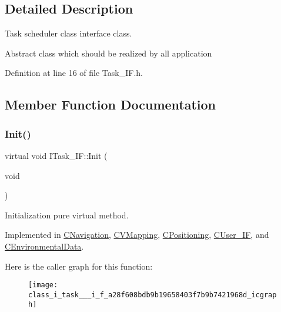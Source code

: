 \subsection{Detailed Description}
Task scheduler class interface class. 

Abstract class which should be realized by all application 

Definition at line 16 of file Task\+\_\+\+I\+F.\+h.



\subsection{Member Function Documentation}
\mbox{\label{class_i_task___i_f_a28f608bdb9b19658403f7b9b7421968d}} 
\subsubsection{\texorpdfstring{Init()}{Init()}}
{\footnotesize\ttfamily virtual void I\+Task\+\_\+\+I\+F\+::\+Init (\begin{DoxyParamCaption}\item[{void}]{ }\end{DoxyParamCaption})\hspace{0.3cm}{\ttfamily [pure virtual]}}



Initialization pure virtual method. 



Implemented in \mbox{\hyperlink{class_c_navigation_a86a0756663ccf76e9c474764b8f7a04f}{C\+Navigation}}, \mbox{\hyperlink{class_c_v_mapping_a110257122b8946bcb8f17051070e03eb}{C\+V\+Mapping}}, \mbox{\hyperlink{class_c_positioning_abdceba66e701554a178acf61c61b0df6}{C\+Positioning}}, \mbox{\hyperlink{class_c_user___i_f_a02c8bba754c77583dc5afaa6877dc547}{C\+User\+\_\+\+IF}}, and \mbox{\hyperlink{class_c_environmental_data_a3321cce122ef1e1f7e995ee51353e87d}{C\+Environmental\+Data}}.

Here is the caller graph for this function\+:
\nopagebreak
\begin{figure}[H]
\begin{center}
\leavevmode
\texttt{[image: class\_i\_task\_\_\_i\_f\_a28f608bdb9b19658403f7b9b7421968d\_icgraph]}
\end{center}
\end{figure}
\mbox{\label{class_i_task___i_f_ab73cc5879a61d00fc59b72cce32cc6f7}} 

